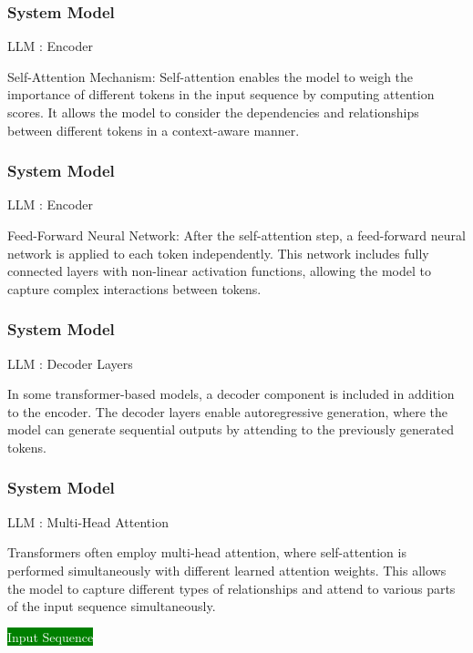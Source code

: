 \newpage
\begin{frame}
\frametitle{ System Model }
\begin{block}{LLM : Encoder}

Self-Attention Mechanism: Self-attention enables the model to weigh the importance of different tokens in the input sequence by computing attention scores. It allows the model to consider the dependencies and relationships between different tokens in a context-aware manner.
 
\end{block}
\end{frame}

\newpage
\begin{frame}
\frametitle{ System Model }
\begin{block}{LLM : Encoder }

 Feed-Forward Neural Network: After the self-attention step, a feed-forward neural network is applied to each token independently. This network includes fully connected layers with non-linear activation functions, allowing the model to capture complex interactions between tokens.
 
\end{block}
\end{frame}


\newpage
\begin{frame}
\frametitle{ System Model }
\begin{block}{LLM : Decoder Layers }

  In some transformer-based models, a decoder component is included in addition to the encoder. The decoder layers enable autoregressive generation, where the model can generate sequential outputs by attending to the previously generated tokens.
 
\end{block}
\end{frame}


\newpage
\begin{frame}
\frametitle{ System Model }
\begin{block}{LLM : Multi-Head Attention}

  Transformers often employ multi-head attention, where self-attention is performed simultaneously with different learned attention weights. This allows the model to capture different types of relationships and attend to various parts of the input sequence simultaneously.

   \colorbox{green}{ \textcolor{white}{ Input Sequence } }
   
\end{block}
\end{frame}



